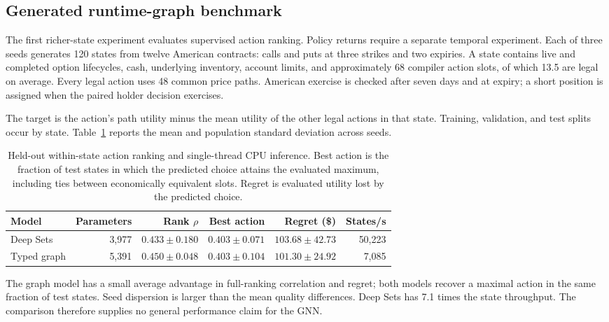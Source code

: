 \documentclass{strategynet-journal}
\begin{document}
\subsection{Generated runtime-graph benchmark}

The first richer-state experiment evaluates supervised action ranking.  Policy
returns require a separate temporal experiment.  Each of three seeds generates 120 states
from twelve American contracts: calls and puts at three strikes and two
expiries.  A state contains live and completed option lifecycles, cash,
underlying inventory, account limits, and approximately 68 compiler action
slots, of which 13.5 are legal on average.  Every legal action uses 48 common
price paths.  American exercise is checked after seven days and at expiry; a
short position is assigned when the paired holder decision exercises.

The target is the action's path utility minus the mean utility of the other
legal actions in that state.  Training, validation, and test splits occur by
state.  Table~\ref{tab:runtime-action-models} reports the mean and population
standard deviation across seeds.

\begin{table}[H]
\centering
\small
\begin{tabular}{lrrrrr}
\toprule
Model & Parameters & Rank \(\rho\) & Best action & Regret (\$) & States/s \\
\midrule
Deep Sets
  & 3,977 & \(0.433\pm0.180\) & \(0.403\pm0.071\)
  & \(103.68\pm42.73\) & 50,223 \\
Typed graph
  & 5,391 & \(0.450\pm0.048\) & \(0.403\pm0.104\)
  & \(101.30\pm24.92\) & 7,085 \\
\bottomrule
\end{tabular}
\caption{Held-out within-state action ranking and single-thread CPU
inference.  Best action is the fraction of test states in which the predicted
choice attains the evaluated maximum, including ties between economically
equivalent slots.  Regret is evaluated utility lost by the predicted choice.}
\label{tab:runtime-action-models}
\end{table}

The graph model has a small average advantage in full-ranking correlation and
regret; both models recover a maximal action in the same fraction of test
states.  Seed dispersion is larger than the mean quality differences.  Deep
Sets has 7.1 times the state throughput.  The comparison therefore supplies
no general performance claim for the GNN.
\end{document}
